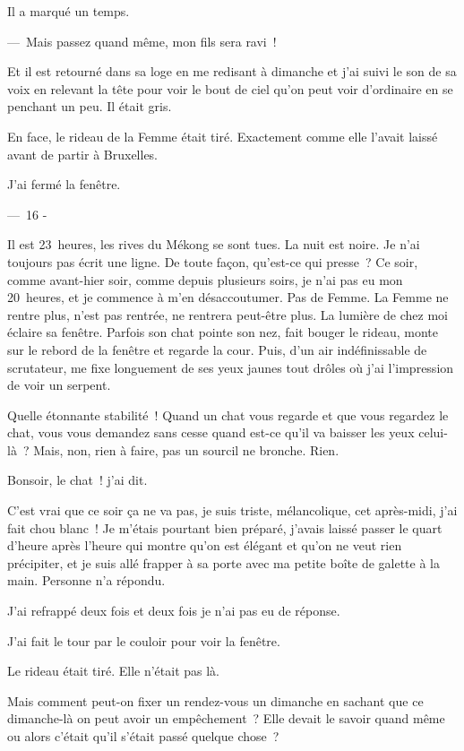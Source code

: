 \documentclass[french,twoside]{book} %
\begin{document}
Il a marqué un temps.\par
— Mais passez quand même, mon fils sera ravi !\par
Et il est retourné dans sa loge en me redisant à dimanche et j’ai suivi le son de sa voix en relevant la tête pour voir le bout de ciel qu’on peut voir d’ordinaire en se penchant un peu. Il était gris.\par
En face, le rideau de la Femme était tiré. Exactement comme elle l’avait laissé avant de partir à Bruxelles.\par
J’ai fermé la fenêtre.\par
\bigbreak
{\centering — 16 -\par}
\bigbreak
\noindent Il est 23 heures, les rives du Mékong se sont tues. La nuit est noire. Je n’ai toujours pas écrit une ligne. De toute façon, qu’est-ce qui presse ? Ce soir, comme avant-hier soir, comme depuis plusieurs soirs, je n’ai pas eu mon 20 heures, et je commence à m’en désaccoutumer. Pas de Femme. La Femme ne rentre plus, n’est pas rentrée, ne rentrera peut-être plus. La lumière de chez moi éclaire sa fenêtre. Parfois son chat pointe son nez, fait bouger le rideau, monte sur le rebord de la fenêtre et regarde la cour. Puis, d’un air indéfinissable de scrutateur, me fixe longuement de ses yeux jaunes tout drôles où j’ai l’impression de voir un serpent.\par
Quelle étonnante stabilité ! Quand un chat vous regarde et que vous regardez le chat, vous vous demandez sans cesse quand est-ce qu’il va baisser les yeux celui-là ? Mais, non, rien à faire, pas un sourcil ne bronche. Rien.\par
Bonsoir, le chat ! j’ai dit.\par
C’est vrai que ce soir ça ne va pas, je suis triste, mélancolique, cet après-midi, j’ai fait chou blanc ! Je m’étais pourtant bien préparé, j’avais laissé passer le quart d’heure après l’heure qui montre qu’on est élégant et qu’on ne veut rien précipiter, et je suis allé frapper à sa porte avec ma petite boîte de galette à la main. Personne n’a répondu.\par
J’ai refrappé deux fois et deux fois je n’ai pas eu de réponse.\par
J’ai fait le tour par le couloir pour voir la fenêtre.\par
Le rideau était tiré. Elle n’était pas là.\par
Mais comment peut-on fixer un rendez-vous un dimanche en sachant que ce dimanche-là on peut avoir un empêchement ? Elle devait le savoir quand même ou alors c’était qu’il s’était passé quelque chose ?\par
\end{document}

